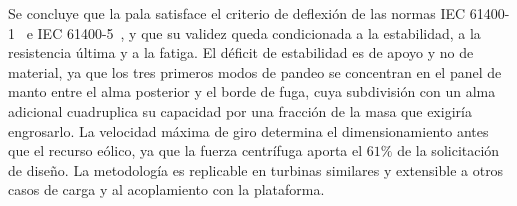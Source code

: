 \documentclass[12pt,letterpaper]{report}
\begin{document}
Se concluye que la pala satisface el criterio de deflexión de las normas IEC 61400-1~\parencite*{IEC61400-1} e IEC 61400-5~\parencite*{IEC61400-5}, y que su validez queda condicionada a la estabilidad, a la resistencia última y a la fatiga. El déficit de estabilidad es de apoyo y no de material, ya que los tres primeros modos de pandeo se concentran en el panel de manto entre el alma posterior y el borde de fuga, cuya subdivisión con un alma adicional cuadruplica su capacidad por una fracción de la masa que exigiría engrosarlo. La velocidad máxima de giro determina el dimensionamiento antes que el recurso eólico, ya que la fuerza centrífuga aporta el $61\%$ de la solicitación de diseño. La metodología es replicable en turbinas similares y extensible a otros casos de carga y al acoplamiento con la plataforma.

\newpage

\setcounter{secnumdepth}{3}
\setcounter{tocdepth}{3}

\begin{singlespace}
    \setlength{\parskip}{0pt} 
    \tableofcontents
    \newpage
    \listoftables
    \newpage
    \listoffigures
\end{singlespace}

\newpage
\setcounter{page}{1}         
\pagestyle{cuerpo}           
\setlength{\parskip}{1em} 







\newpage


\newpage
\printnoidxglossary[type=\acronymtype, title={Glosario}, sort=word, nonumberlist]

\glsaddall
\begin{singlespace}
\printnoidxglossary[type=simbolos, title={Nomenclatura}, sort=word, nogroupskip, style=nomenclatura]
\end{singlespace}

\newpage
\begin{singlespace}
\setlength{\emergencystretch}{2em}
\printbibliography[heading=bibintoc, title={Bibliografía}]
\end{singlespace}






\end{document}
